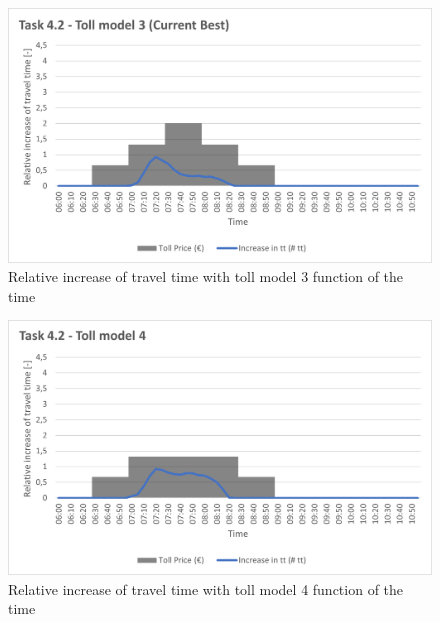 \documentclass[a4paper, 12pt,oneside]{article}
\begin{document}
\begin{minipage}[c]{0.5\textwidth}
\begin{figure}[H]
    \centering
    \includegraphics[width=1\textwidth]{Images/Step4/Task4.2_Toll_model_3.png}
    \caption{Relative increase of travel time with toll model 3 function of the time}
    \label{fig:Relative increase of travel time with toll model 3 function of the time}
\end{figure}
\end{minipage}
\begin{minipage}[c]{0.5\textwidth}
\begin{figure}[H]
    \centering
    \includegraphics[width=1\textwidth]{Images/Step4/Task4.2_Toll_model_4.png}
    \caption{Relative increase of travel time with toll model 4 function of the time}
    \label{fig:Relative increase of travel time with toll model 4 function of the time}
\end{figure}
\end{minipage}
\end{document}
